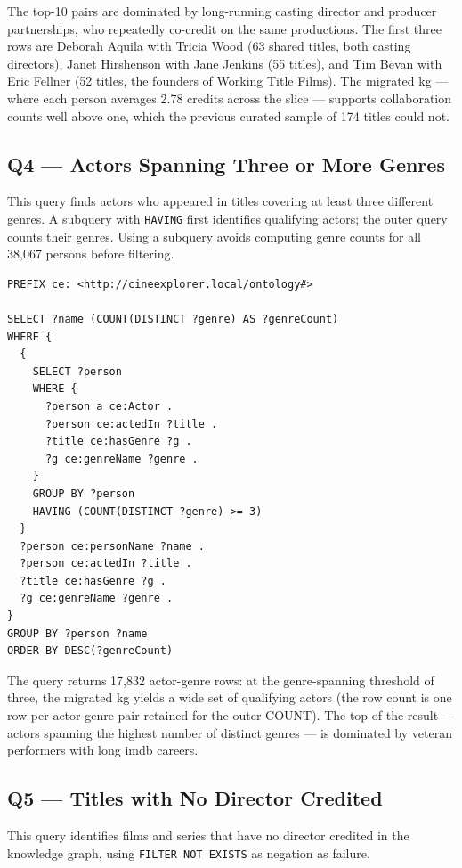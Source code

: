 The top-10 pairs are dominated by long-running casting director and producer partnerships, who repeatedly co-credit on the same productions. The first three rows are Deborah Aquila with Tricia Wood (63 shared titles, both casting directors), Janet Hirshenson with Jane Jenkins (55 titles), and Tim Bevan with Eric Fellner (52 titles, the founders of Working Title Films). The migrated \ac{kg} --- where each person averages 2.78 credits across the slice --- supports collaboration counts well above one, which the previous curated sample of 174 titles could not.

\subsection{Q4 — Actors Spanning Three or More Genres}

This query finds actors who appeared in titles covering at least three different genres. A subquery with \texttt{HAVING} first identifies qualifying actors; the outer query counts their genres. Using a subquery avoids computing genre counts for all 38{,}067 persons before filtering.

\begin{lstlisting}[language=SPARQL]
PREFIX ce: <http://cineexplorer.local/ontology#>

SELECT ?name (COUNT(DISTINCT ?genre) AS ?genreCount)
WHERE {
  {
    SELECT ?person
    WHERE {
      ?person a ce:Actor .
      ?person ce:actedIn ?title .
      ?title ce:hasGenre ?g .
      ?g ce:genreName ?genre .
    }
    GROUP BY ?person
    HAVING (COUNT(DISTINCT ?genre) >= 3)
  }
  ?person ce:personName ?name .
  ?person ce:actedIn ?title .
  ?title ce:hasGenre ?g .
  ?g ce:genreName ?genre .
}
GROUP BY ?person ?name
ORDER BY DESC(?genreCount)
\end{lstlisting}

The query returns 17{,}832 actor-genre rows: at the genre-spanning threshold of three, the migrated \ac{kg} yields a wide set of qualifying actors (the row count is one row per actor-genre pair retained for the outer COUNT). The top of the result --- actors spanning the highest number of distinct genres --- is dominated by veteran performers with long \ac{imdb} careers.

\subsection{Q5 — Titles with No Director Credited}

This query identifies films and series that have no director credited in the knowledge graph, using \texttt{FILTER NOT EXISTS} as negation as failure.


